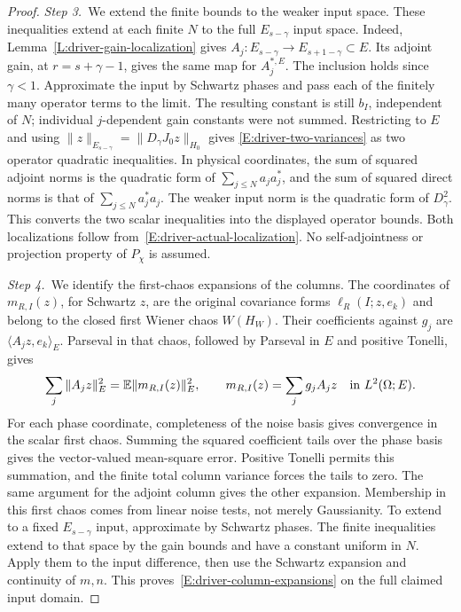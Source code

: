 \begin{proof}
  \medskip
  \noindent\textit{Step 3.~}We extend the finite bounds to the weaker input
  space.
  These inequalities extend at each finite $N$ to the full $E_{s-\gamma}$ input
  space. Indeed, Lemma~\ref{L:driver-gain-localization} gives $A_j:E_{s-\gamma}
  \to E_{s+1-\gamma} \subset E$. Its adjoint gain, at $r = s+\gamma-1$, gives
  the same map for $A_j^{*,E}$. The inclusion holds since $\gamma < 1$.
  Approximate the input by Schwartz phases and pass each of the finitely many
  operator terms to the limit. The resulting constant is still $b_I$,
  independent of $N$; individual $j$-dependent gain constants were not summed.
  Restricting to $E$ and using $\|z\|_{E_{s-\gamma}} = \|D_\gamma J_0z\|_{H_0}$
  gives \eqref{E:driver-two-variances} as two operator quadratic inequalities.
  In physical coordinates, the sum of squared adjoint norms is the quadratic
  form of $\sum_{j\le N}a_ja_j^*$, and the sum of squared direct norms is that
  of $\sum_{j\le N}a_j^*a_j$. The weaker input norm is the quadratic form of
  $D_\gamma^2$. This converts the two scalar inequalities into the displayed
  operator bounds.
  Both localizations follow from~\eqref{E:driver-actual-localization}. No
  self-adjointness or projection property of $P_\chi$ is assumed.

  \medskip
  \noindent\textit{Step 4.~}We identify the first-chaos expansions of the
  columns.
  The coordinates of $m_{R,I}(z)$, for Schwartz $z$, are the original covariance
  forms $\ell_R(I;z,e_k)$ and belong to the closed first Wiener chaos $W(H_W)$.
  Their coefficients against $g_j$ are $\langle A_jz,e_k\rangle_E$. Parseval in
  that chaos, followed by Parseval in $E$ and positive Tonelli, gives
  \[
    \sum_j\|A_jz\|_E^2=\mathbb{E}\|m_{R,I}(z)\|_E^2,
    \qquad m_{R,I}(z)=\sum_jg_jA_jz\quad\text{in }L^2(\Omega;E).
  \]
  For each phase coordinate, completeness of the noise basis gives convergence
  in the scalar first chaos. Summing the squared coefficient tails over the
  phase basis gives the vector-valued mean-square error. Positive Tonelli
  permits this summation, and the finite total column variance forces the
  tails to zero.
  The same argument for the adjoint column gives the other expansion. Membership
  in this first chaos comes from linear noise tests, not merely Gaussianity. To
  extend to a fixed $E_{s-\gamma}$ input, approximate by Schwartz phases. The
  finite inequalities extend to that space by the gain bounds and have a
  constant uniform in $N$. Apply them to the input difference, then use the
  Schwartz expansion and continuity of $m,n$. This
  proves~\eqref{E:driver-column-expansions} on the full claimed input domain.


\end{proof}
